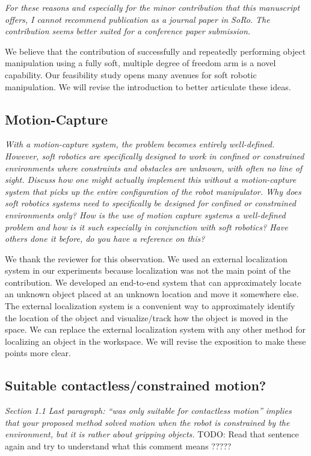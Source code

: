 \documentclass[letterpaper, 10 pt, twocolumn, conference]{article}
\begin{document}
\textit{For these reasons and especially for the minor contribution that this manuscript offers, I cannot recommend publication as a journal paper in SoRo. The contribution seems better suited for a conference paper submission.}

We believe that the contribution of successfully and repeatedly performing object manipulation using a fully soft, multiple degree of freedom arm is a novel capability. Our feasibility study opens many avenues for soft robotic manipulation. We will revise the introduction to better articulate these ideas. 

\subsection{Motion-Capture}
\textit{With a motion-capture system, the problem becomes entirely well-defined.
However, soft robotics are specifically designed to work in confined or constrained environments where constraints and obstacles are unknown, with often no line of sight. Discuss how one might actually implement this without a motion-capture system that picks up the entire configuration of the robot manipulator.
Why does soft robotics systems need to specifically be designed for confined or constrained environments only? How is the use of motion capture systems a well-defined problem and how is it such especially in conjunction with soft robotics? Have others done it before, do you have a reference on this?}

We thank the reviewer for this observation. We used an external localization system in our experiments because localization was not the main point of the contribution. We developed an end-to-end system that can approximately locate an unknown object placed at an unknown location and move it somewhere else. The external localization system is a convenient way to approximately identify the location of the object and visualize/track how the object is moved in the space. We can replace the external localization system with any other method for localizing an object in the workspace. We will revise the exposition to make these points more clear. 

\subsection{Suitable contactless/constrained motion?}
\textit{Section 1.1 Last paragraph: “was only suitable for contactless motion” implies that your proposed method solved motion when the robot is constrained by the environment, but it is rather about gripping objects.}
TODO: Read that sentence again and try to understand what this comment means ?????
\end{document}
